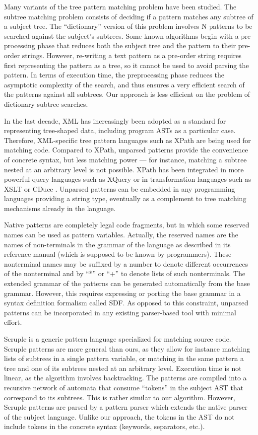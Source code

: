 \documentclass{sigplanconf}
\begin{document}
Many variants of the tree pattern matching problem have been
studied. The subtree matching problem consists of deciding if a
pattern matches any subtree of a subject tree. The ``dictionary''
version of this problem involves N patterns to be searched against the
subject's subtrees. Some known algorithms \cite{rooted} begin with a
pre-processing phase that reduces both the subject tree and the
pattern to their pre-order strings. However, re-writing a text pattern
as a pre-order string requires first representing the pattern as a
tree, so it cannot be used to avoid parsing the pattern. In terms of
execution time, the preprocessing phase reduces the asymptotic
complexity of the search, and thus ensures a very efficient search of
the patterns against all subtrees. Our approach is less efficient on
the problem of dictionary subtree searches.

In the last decade, XML has increasingly been adopted as a standard
for representing tree-shaped data, including program ASTs as a
particular case. Therefore, XML-specific tree pattern languages such
as XPath are being used for matching code. Compared to XPath, unparsed
patterns provide the convenience of concrete syntax, but less matching
power --- for instance, matching a subtree nested at an arbitrary
level is not possible. XPath has been integrated in more powerful
query languages such as XQuery or in transformation languages such as
XSLT or CDuce \cite{cduce}. Unparsed patterns can be embedded in any
programming languages providing a string type, eventually as a
complement to tree matching mechanisms already in the language.

Native patterns \cite{native} are completely legal code fragments, but
in which some reserved names can be used as pattern
variables. Actually, the reserved names are the names of non-terminals
in the grammar of the language as described in its reference manual
(which is supposed to be known by programmers). These nonterminal
names may be suffixed by a number to denote different occurrences of
the nonterminal and by ``*'' or ``+'' to denote lists of such
nonterminals. The extended grammar of the patterns can be generated
automatically from the base grammar. However, this requires expressing
or porting the base grammar in a syntax definition formalism called
SDF. As opposed to this constraint, unparsed patterns can be
incorporated in any existing parser-based tool with minimal effort.

Scruple \cite{scruple} is a generic pattern language specialized for
matching source code. Scruple patterns are more general than ours, as
they allow for instance matching lists of subtrees in a single pattern
variable, or matching in the same pattern a tree and one of its
subtrees nested at an arbitrary level. Execution time is not linear,
as the algorithm involves backtracking. The patterns are compiled into
a recursive network of automata that consume ``tokens'' in the subject
AST that correspond to its subtrees. This is rather similar to our
algorithm. However, Scruple patterns are parsed by a pattern parser
which extends the native parser of the subject language. Unlike our
approach, the tokens in the AST do not include tokens in the concrete
syntax (keywords, separators, etc.).
\end{document}
